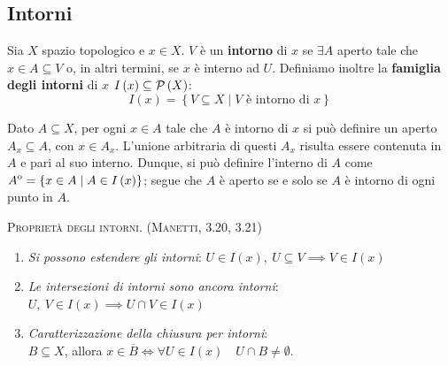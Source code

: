 \subsection{Intorni}
\begin{define}
Sia $X$ spazio topologico e $x\in X$. $V$ è un \textbf{intorno} di $x$ se $\exists A$ aperto tale che $x\in A\subseteq V$ o, in altri termini, se $x$ è interno ad $U$.
Definiamo inoltre la \textbf{famiglia degli intorni} di $x$ $I\left(x\right)\subseteq\mathcal{P}\left(X\right)$:
\begin{equation}
I\left(x\right)=\left\{V\subseteq X\mid V\text{ è intorno di }x \right\}
\end{equation}
\end{define}
\begin{observe}
	Dato $A\subseteq X$, per ogni $x\in A$ tale che $A$ è intorno di $x$ si può definire un aperto $A_x\subseteq A$, con $x\in A_x$. L'unione arbitraria di questi $A_x$ risulta essere contenuta in $A$ e pari al suo interno. Dunque, si può definire l'interno di $A$ come ${\kern0ptA}^{\mathrm{o}}=\left\{x\in A\mid A\in I\left(x\right)\right\}$; segue che $A$ è aperto se e solo se $A$ è intorno di ogni punto in $A$.
\end{observe}
\begin{lemming}\textsc{Proprietà degli intorni. (Manetti, 3.20, 3.21)}
\begin{enumerate}
\item \textit{Si possono estendere gli intorni}: $U\in I\left(x\right),\ U\subseteq V\implies V\in I\left(x\right)$
\item \textit{Le intersezioni di intorni sono ancora intorni}: $U,\ V\in I\left(x\right)\implies U\cap V\in I\left(x\right)$
\item \textit{Caratterizzazione della chiusura per intorni}:\\$B\subseteq X$, allora $x\in\overline{B}\iff\forall U\in I\left(x\right)\quad U\cap B\neq \emptyset$.
\end{enumerate}
\end{lemming}
